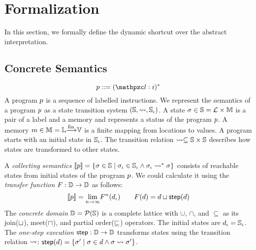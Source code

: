 \section{Formalization}

In this section, we formally define the dynamic shortcut over the abstract
interpretation.


\subsection{Concrete Semantics}
\[
  \prog ::= (\lab: \inst)^*\\
\]
A program $p$ is a sequence of labelled instructions.  We represent the
semantics of a program $p$ as a state transition system $(\mathbb{S}, \leadsto,
\mathbb{S}_\iota)$.  A state $\sigma \in \mathbb{S} = \mathcal{L} \times \mathbb{M}$ is a pair of a
label and a memory and represents a status of the program $p$.  A memory
$m \in \mathbb{M} = \mathbb{L} {\xrightarrow[]{\text{fin}}} \mathbb{V}$ is a finite mapping from locations
to values. A program starts with an initial state in $\mathbb{S}_\iota$.  The transition
relation $\leadsto \subseteq \mathbb{S} \times \mathbb{S}$ describes how states are
transformed to other states.

A \textit{collecting semantics} $[\![{p}]\!] = \{ \sigma \in \mathbb{S} \mid \sigma_\iota \in
\mathbb{S}_\iota \wedge \sigma_\iota \leadsto^* \sigma \}$ consists of reachable states from initial
states of the program $p$.  We could calculate it using the \textit{transfer
function} $F: \mathbb{D} \rightarrow \mathbb{D}$ as follows:
\[
  [\![{p}]\!] = \underset{n \rightarrow \infty}{\lim}{F^n(d_\iota)}\\
  \qquad
  F(d) = d \sqcup \textsf{step}(d)\\
\]
The \textit{concrete domain} $\mathbb{D} = \mathcal{P}(\mathbb{S})$ is a complete lattice
with $\cup$, $\cap$, and $\subseteq$ as its join($\sqcup$), meet($\sqcap$), and
partial order($\sqsubseteq$) operators.  The initial states are $d_\iota = \mathbb{S}_\iota$.
The \textit{one-step execution} $\textsf{step}: \mathbb{D} \rightarrow \mathbb{D}$ transforms states
using the transition relation $\leadsto$: $\textsf{step}(d) = \{ \sigma' \mid \sigma \in
d \wedge \sigma \leadsto \sigma' \}$.



